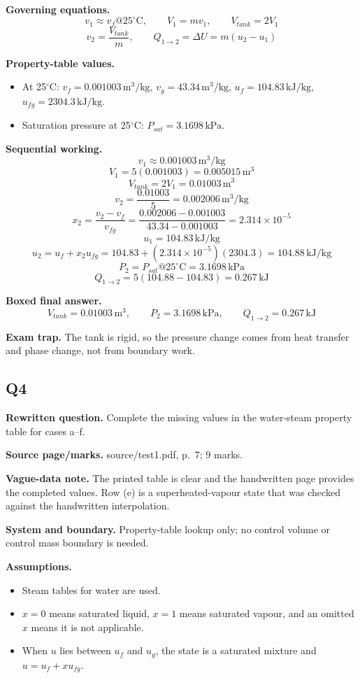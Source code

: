 \textbf{Governing equations.}
\[
v_1\approx v_f@25^\circ\text{C},\qquad V_1=mv_1,\qquad V_{tank}=2V_1
\]
\[
v_2=\frac{V_{tank}}{m},\qquad Q_{1\to2}=\Delta U=m(u_2-u_1)
\]

\textbf{Property-table values.}
\begin{itemize}
  \item At 25$^\circ$C: $v_f=0.001003\,\text{m}^3/\text{kg}$, $v_g=43.34\,\text{m}^3/\text{kg}$, $u_f=104.83\,\text{kJ/kg}$, $u_{fg}=2304.3\,\text{kJ/kg}$.
  \item Saturation pressure at 25$^\circ$C: $P_{sat}=3.1698\,\text{kPa}$.
\end{itemize}

\textbf{Sequential working.}
\[
v_1\approx 0.001003\,\text{m}^3/\text{kg}
\]
\[
V_1=5(0.001003)=0.005015\,\text{m}^3
\]
\[
V_{tank}=2V_1=0.01003\,\text{m}^3
\]
\[
v_2=\frac{0.01003}{5}=0.002006\,\text{m}^3/\text{kg}
\]
\[
x_2=\frac{v_2-v_f}{v_{fg}}=\frac{0.002006-0.001003}{43.34-0.001003}=2.314\times10^{-5}
\]
\[
u_1=104.83\,\text{kJ/kg}
\]
\[
u_2=u_f+x_2u_{fg}=104.83+(2.314\times10^{-5})(2304.3)=104.88\,\text{kJ/kg}
\]
\[
P_2=P_{sat}@25^\circ\text{C}=3.1698\,\text{kPa}
\]
\[
Q_{1\to2}=5(104.88-104.83)=0.267\,\text{kJ}
\]

\textbf{Boxed final answer.}
\[
\boxed{V_{tank}=0.01003\,\text{m}^3,\qquad P_2=3.1698\,\text{kPa},\qquad Q_{1\to2}=0.267\,\text{kJ}}
\]

\textbf{Exam trap.} The tank is rigid, so the pressure change comes from heat transfer and phase change, not from boundary work.


\subsection*{Q4}
\textbf{Rewritten question.} Complete the missing values in the water-steam property table for cases a--f.

\textbf{Source page/marks.} source/test1.pdf, p.~7; 9 marks.

\textbf{Vague-data note.} The printed table is clear and the handwritten page provides the completed values. Row (e) is a superheated-vapour state that was checked against the handwritten interpolation.

\textbf{System and boundary.} Property-table lookup only; no control volume or control mass boundary is needed.

\textbf{Assumptions.}
\begin{itemize}
  \item Steam tables for water are used.
  \item $x=0$ means saturated liquid, $x=1$ means saturated vapour, and an omitted $x$ means it is not applicable.
  \item When $u$ lies between $u_f$ and $u_g$, the state is a saturated mixture and $u=u_f+xu_{fg}$.
\end{itemize}

